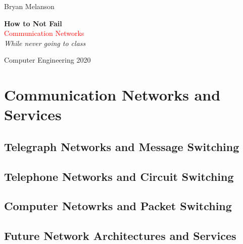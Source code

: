 \documentclass[11pt]{article}
\newcommand*{\plogo}{\fbox{$\mathcal{BM}$}}
\begin{document}
 
        
    \begin{titlepage}
    
        \raggedleft
        
        \vspace*{\baselineskip}
        
        {\Large Bryan Melanson}
        
        \vspace*{0.167\textheight}
        
        \textbf{\LARGE How to Not Fail}\\[\baselineskip]
        
        {\textcolor{Red}{\Huge Communication Networks}}\\[\baselineskip]
        
        {\Large \textit{While never going to class}}
        
        \vfill
        
        {\large Computer Engineering 2020 ~~\plogo}
        
        \vspace*{3\baselineskip}
    
    \end{titlepage}

    \pagebreak
    
    
    \tableofcontents
    \newpage

\section{Communication Networks and Services}
\subsection{Telegraph Networks and Message Switching}
\subsection{Telephone Networks and Circuit Switching}
\subsection{Computer Netowrks and Packet Switching}
\subsection{Future Network Architectures and Services}
\end{document}
